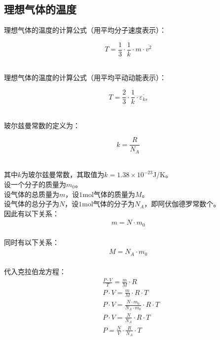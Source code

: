 \documentclass[UTF8]{ctexart}
\begin{document}
\subsection{理想气体的温度}
    \setcounter{equation}{0}
    理想气体的温度的计算公式（用平均分子速度表示）：\vspace{5pt}
    \begin{large}
        \begin{equation*}
            T=\frac{1}{3}\cdot\frac{1}{k}\cdot m\cdot\overline{v^2}
        \end{equation*}
    \end{large}\\
    理想气体的温度的计算公式（用平均平动动能表示）：\vspace{5pt}
    \begin{large}
        \begin{equation*}
            T=\frac{2}{3}\cdot\frac{1}{k}\cdot\overline{\varepsilon_{ks}}
        \end{equation*}
    \end{large}\\
    玻尔兹曼常数的定义为：
    \begin{large}
        \begin{equation*}
            k=\frac{R}{N_A}
        \end{equation*}
    \end{large}\\
    其中$k$为玻尔兹曼常数，其取值为$k=1.38\times 10^{-23}$\si{J/K}。\\[6mm]
    设一个分子的质量为$m_0$。\\[3mm]
    设气体的总质量为$m$，设$1$\si{mol}气体的质量为$M$。\\[3mm]
    设气体的总分子为$N$，设$1$\si{mol}气体的分子为$N_A$，即阿伏伽德罗常数个。\\[5mm]
    因此有以下关系：
    \begin{align}
        m=N\cdot m_0
    \end{align}\\
    同时有以下关系：
    \begin{align}
        M=N_A\cdot m_0
    \end{align}\\
    代入克拉伯龙方程：
    \begin{align}
        &\frac{P\cdot V}{T}=\frac{m}{M}\cdot R\\[3mm]
        &P\cdot V=\frac{m}{M}\cdot R\cdot T\\[3mm]
        &P\cdot V=\frac{N\cdot m_0}{N_A\cdot m_0}\cdot R\cdot T\\[3mm]
        &P\cdot V=\frac{N}{N_A}\cdot R\cdot T\\[3mm]
        &P=\frac{N}{V}\cdot\frac{R}{N_A}\cdot T
    \end{align}
\end{document}
